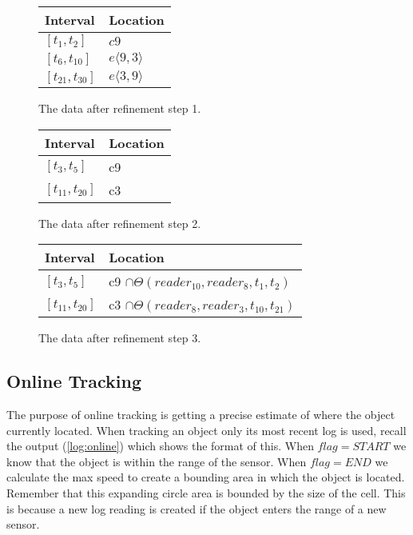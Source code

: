 \begin{figure}
\begin{minipage}[tbh]{\columnwidth}

  \vspace*{\fill}
  \centering
		\begin{tabular}{ l  l  }
		\toprule
		\textbf{Interval} & \textbf{Location}\\ 
		\midrule
		$[t_1,t_2]$ & $c9$ \\ 

		$[t_6,t_{10}]$ &  $e\langle9,3\rangle$\\ 

		$[t_{21},t_{30}]$ &  $ e\langle3,9\rangle $\\ 
		\bottomrule
		\end{tabular}
  \caption{The data after refinement step 1.}
  \label{fig:ref1} \par\vfill
	
	
		\begin{tabular}{  l  l  }
		\toprule
		\textbf{Interval} & \textbf{Location}\\ 
		\midrule
		$[t_3,t_5]$ & c9 \\ 

		$[t_{11},t_{20}]$ &  c3\\ 
		\bottomrule
		\end{tabular}
  \caption{The data after refinement step 2.}
  \label{fig:ref2}
	
		\begin{tabular}{  l  l  }
		\toprule
		\textbf{Interval} & \textbf{Location}\\ 
		\midrule
		$[t_3,t_5]$ & c9 $\cap \Theta(reader_10,reader_8,t_1,t_2)$ \\ 

		$[t_{11},t_{20}]$ &  c3 $\cap \Theta(reader_8,reader_3,t_{10},t_{21})$\\ 
		\hline
		\end{tabular}
			
	\caption{The data after refinement step 3.}
  \label{fig:ref3}

\end{minipage}
\end{figure}


\subsection{Online Tracking}
\label{sub:online}
The purpose of online tracking is getting a precise estimate of where the object currently located.
When tracking an object only its most recent log is used, recall the output (\ref{log:online}) which shows the format of this.
When $flag=START$ we know that the object is within the range of the sensor.
When $flag=END$ we calculate the max speed to create a bounding area in which the object is located. Remember that this expanding circle area is bounded by the size of the cell. 
This is because a new log reading is created if the object enters the range of a new sensor.

